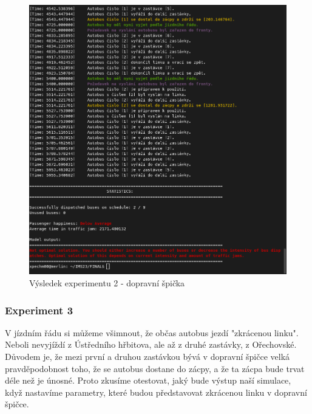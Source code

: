 \documentclass[a4paper]{article}
\begin{document}
                \begin{figure}[H]
                \includegraphics[scale=0.48, keepaspectratio]{fig/ims_bus2.png}
                \caption{Výsledek experimentu 2 - dopravní špička}
                \label{fig:experiment2}
            \end{figure}
    \newpage
            \subsubsection{Experiment 3}
            \label{subsubsec:experiment3}

                V jízdním řádu \cite{Jizdni_rad} si můžeme všimnout, že občas autobus jezdí "zkrácenou linku". Neboli nevyjíždí z Ústředního hřbitova, ale až z druhé zastávky, z Ořechovské. Důvodem je, že mezi první a druhou zastávkou bývá v dopravní špičce velká pravděpodobnost toho, že se autobus dostane do zácpy, a že ta zácpa bude trvat déle než je únosné. Proto zkusíme otestovat, jaký bude výstup naší simulace, když nastavíme parametry, které budou představovat zkrácenou linku v dopravní špičce.
                
\end{document}
